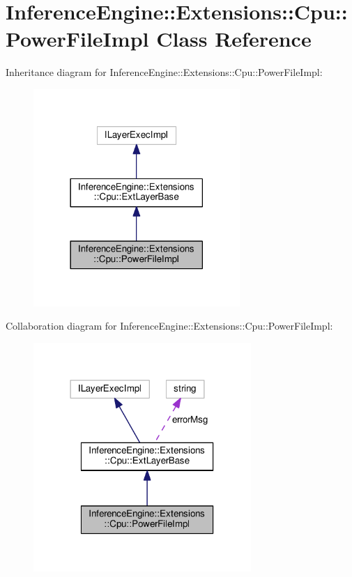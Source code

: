 \hypertarget{classInferenceEngine_1_1Extensions_1_1Cpu_1_1PowerFileImpl}{}\section{Inference\+Engine\+:\+:Extensions\+:\+:Cpu\+:\+:Power\+File\+Impl Class Reference}
\label{classInferenceEngine_1_1Extensions_1_1Cpu_1_1PowerFileImpl}


Inheritance diagram for Inference\+Engine\+:\+:Extensions\+:\+:Cpu\+:\+:Power\+File\+Impl\+:
\nopagebreak
\begin{figure}[H]
\begin{center}
\leavevmode
\includegraphics[width=222pt]{classInferenceEngine_1_1Extensions_1_1Cpu_1_1PowerFileImpl__inherit__graph}
\end{center}
\end{figure}


Collaboration diagram for Inference\+Engine\+:\+:Extensions\+:\+:Cpu\+:\+:Power\+File\+Impl\+:
\nopagebreak
\begin{figure}[H]
\begin{center}
\leavevmode
\includegraphics[width=234pt]{classInferenceEngine_1_1Extensions_1_1Cpu_1_1PowerFileImpl__coll__graph}
\end{center}
\end{figure}
